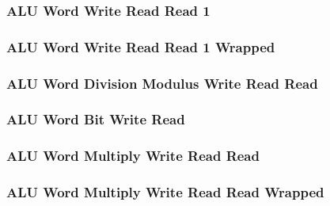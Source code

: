 \subsubsection[{\small ALU Word Write Read Read 1}]{ALU Word Write Read Read 1} \label{sec:format-ALU-WWRR1}



\subsubsection[{\small ALU Word Write Read Read 1 Wrapped}]{ALU Word Write Read Read 1 Wrapped} \label{sec:format-ALU-WWRR1.W}



\subsubsection[{\small ALU Word Division Modulus Write Read Read}]{ALU Word Division Modulus Write Read Read} \label{sec:format-ALU-WDMWRR}



\subsubsection[{\small ALU Word Bit Write Read}]{ALU Word Bit Write Read} \label{sec:format-ALU-BWRW}



\subsubsection[{\small ALU Word Multiply Write Read Read}]{ALU Word Multiply Write Read Read} \label{sec:format-ALU-WMWRR}



\subsubsection[{\small ALU Word Multiply Write Read Read Wrapped}]{ALU Word Multiply Write Read Read Wrapped} \label{sec:format-ALU-WMWRR.W}

